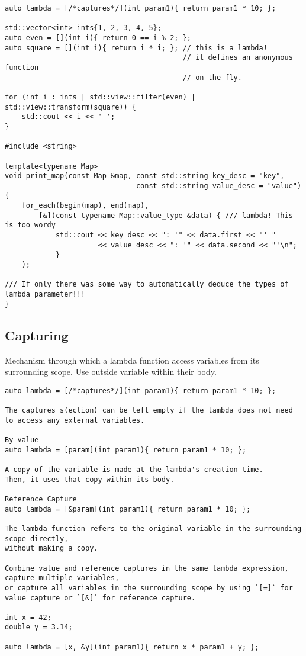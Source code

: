 \documentclass[openany]{report}
\begin{document}
\begin{verbatim}
auto lambda = [/*captures*/](int param1){ return param1 * 10; };

std::vector<int> ints{1, 2, 3, 4, 5};
auto even = [](int i){ return 0 == i % 2; };
auto square = [](int i){ return i * i; }; // this is a lambda!
                                          // it defines an anonymous function
                                          // on the fly.

for (int i : ints | std::view::filter(even) | std::view::transform(square)) {
    std::cout << i << ' ';
}

#include <string>

template<typename Map>
void print_map(const Map &map, const std::string key_desc = "key",
                               const std::string value_desc = "value")
{
    for_each(begin(map), end(map),
        [&](const typename Map::value_type &data) { /// lambda! This is too wordy
            std::cout << key_desc << ": '" << data.first << "' "
                      << value_desc << ": '" << data.second << "'\n";
            }
    );

/// If only there was some way to automatically deduce the types of lambda parameter!!!
}
\end{verbatim}

\subsection{Capturing}

Mechanism through which a lambda function access variables from its surrounding scope.
Use outside variable within their body.

\begin{verbatim}
auto lambda = [/*captures*/](int param1){ return param1 * 10; };

The captures s(ection) can be left empty if the lambda does not need to access any external variables.

By value
auto lambda = [param](int param1){ return param1 * 10; };

A copy of the variable is made at the lambda's creation time.
Then, it uses that copy within its body. 

Reference Capture
auto lambda = [&param](int param1){ return param1 * 10; };

The lambda function refers to the original variable in the surrounding scope directly,
without making a copy. 

Combine value and reference captures in the same lambda expression, 
capture multiple variables, 
or capture all variables in the surrounding scope by using `[=]` for value capture or `[&]` for reference capture.

int x = 42;
double y = 3.14;

auto lambda = [x, &y](int param1){ return x * param1 + y; };
\end{verbatim}
\end{document}
